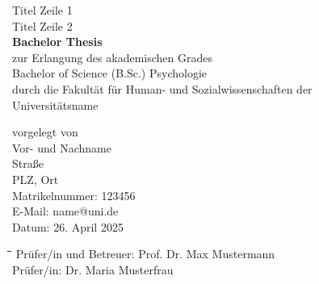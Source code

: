 \vspace*{4\baselineskip}
\thispagestyle{empty}
\begin{center}
   Titel Zeile 1\\Titel Zeile 2 \\
    \vspace*{5\baselineskip}
    \textbf{Bachelor Thesis} \\
    \vspace*{2\baselineskip}
    zur Erlangung des akademischen Grades \\
Bachelor of Science (B.Sc.) Psychologie \\
durch die Fakultät für Human- und Sozialwissenschaften der \\
Universitätsname \\
\vspace*{4\baselineskip}
\end{center}
vorgelegt von \\
\noindent Vor- und Nachname\\
\noindent \hspace{.5in} Straße \\
\noindent\hspace{.5in} PLZ, Ort \\
\noindent Matrikelnummer: 123456 \\
\noindent E-Mail: name@uni.de \\
\noindent Datum: 26. April 2025 \\
\begin{tabbing}
     \hspace*{1cm}\=\hspace*{1.5in}\=\hspace*{4cm}\=\hspace*{2.7cm}\= \kill
     Prüfer/in und Betreuer: \> \> Prof. Dr. Max Mustermann \\
     Prüfer/in: \> \>  Dr. Maria Musterfrau
\end{tabbing}